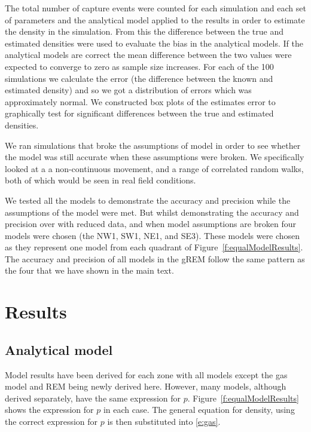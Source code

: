 \documentclass[a4paper,10pt,reqno,oneside]{amsart}
\begin{document}
The total number of capture events were counted for each simulation and each set of parameters and the analytical model applied to the results in order to estimate the density in the simulation. From this the difference between the true and estimated densities were used to evaluate the bias in the analytical models. If the analytical models are correct the mean difference between the two values were expected to converge to zero as sample size increases. For each of the 100 simulations we calculate the error (the difference between the known and estimated density) and so we got a distribution of errors which was approximately normal. We constructed box plots of the estimates error to graphically test for significant differences between the true and estimated densities. 

We ran simulations that broke the assumptions of model in order to see whether the model was still accurate when these assumptions were broken. We specifically looked at a a non-continuous movement, and a range of correlated random walks, both of which would be seen in real field conditions.

We tested all the models to demonstrate the accuracy and precision while the assumptions of the model were met. But whilst demonstrating the accuracy and precision over with reduced data, and when model assumptions are broken four models were chosen (the NW1, SW1, NE1, and SE3). These models were chosen as they represent one model from each quadrant of Figure~\ref{f:equalModelResults}. The accuracy and precision of all models in the gREM follow the same pattern as the four that we have shown in the main text. 


\section{Results}

\subsection{Analytical model}

Model results have been derived for each zone with all models except the gas model and REM being newly derived here. However, many models, although derived separately, have the same expression for $p$. Figure~\ref{f:equalModelResults} shows the expression for $p$ in each case. The general equation for density, using the correct expression for $p$ is then substituted into \ref{e:gas}.
\end{document}
